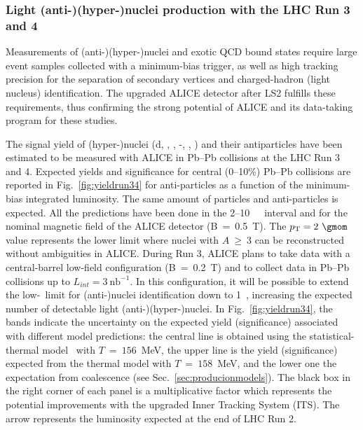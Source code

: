 \subsubsection{Light (anti-)(hyper-)nuclei production with the LHC Run 3 and 4}
\label{sec:hyper}
Measurements of (anti-)(hyper-)nuclei and exotic QCD bound states require large event samples collected with a minimum-bias trigger, as well as high tracking precision for the separation of secondary vertices and charged-hadron (light nucleus) identification. The upgraded ALICE detector after LS2 \cite{Abelevetal:2014dna, ALICE:2014qrd,alice-up-trg,Buncic:2015ari} fulfills these requirements, thus confirming the strong potential of ALICE and its data-taking program for these studies.

The signal yield of (hyper-)nuclei (d,  \hethree, \hefour, \hyp, \hypfour, \hyphefour) and their antiparticles have been estimated to be measured with ALICE in Pb--Pb collisions at the LHC Run 3 and 4. 
Expected yields and significance for central (0--10\%) Pb--Pb collisions are reported in Fig.~\ref{fig:yieldrun34} for anti-particles as a function of the minimum-bias integrated luminosity. The same amount of particles and anti-particles is expected. 
All the predictions have been done in the 2--10~\gmom\ \pT\ interval and for the nominal magnetic field of the ALICE detector (B~=~0.5~T). The $\pT = 2~\gmom$ value represents the lower limit where nuclei with $A~\geq~3$ can be reconstructed without ambiguities in ALICE. 
During Run 3, ALICE plans to take data with a central-barrel low-field configuration (B~=~0.2~T) and to collect data in Pb--Pb collisions up to $L_{int} = 3~\mathrm{nb}^{-1}$. 
In this configuration, it will be possible to extend the low-\pT\ limit for \mbox{(anti-)nuclei} identification down to 1~\gmom, increasing the expected number of detectable light \mbox{(anti-)(hyper-)nuclei.} 
In Fig.~\ref{fig:yieldrun34}, the bands indicate the uncertainty on the expected yield 
(significance) associated with different model predictions:
the central line is obtained using the statistical-thermal model~\cite{Andronic:2010qu} with $T~=~156$~MeV, the upper line is the yield (significance) expected from the thermal model with $T~=~158$~MeV,  and the lower one the expectation from coalescence (see Sec.~\ref{sec:producionmodels}). 
The black box in the right corner of each panel is a multiplicative factor which represents the potential improvements with the upgraded Inner Tracking System (ITS).  The arrow represents the luminosity expected at the end of LHC Run 2. 

